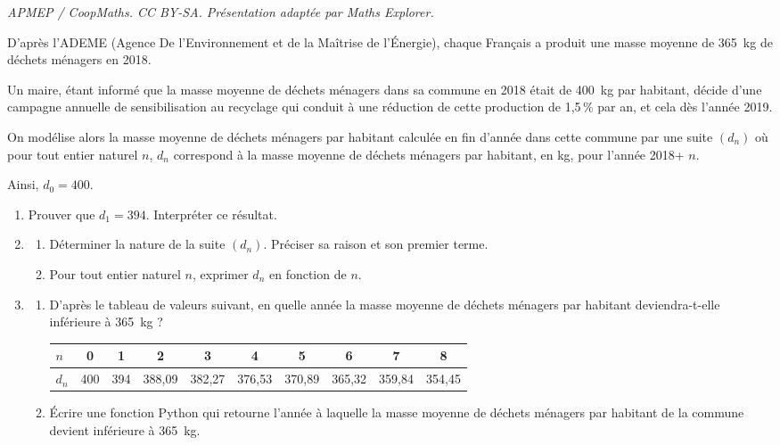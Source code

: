 \documentclass[10pt]{article}
\providecommand{\np}[2][]{{#2~#1}}
\begin{document}
\noindent\textit{APMEP / CoopMaths. CC BY-SA. Présentation adaptée par Maths Explorer.}\par\medskip
\medskip

D'après l'ADEME (Agence De l'Environnement et de la Maîtrise de l'Énergie), chaque Français
a produit une masse moyenne de \np[kg]{365}  de déchets ménagers en 2018.

Un maire, étant informé que la masse moyenne de déchets ménagers dans sa commune en
2018 était de \np[kg]{400}  par habitant, décide d'une campagne annuelle de sensibilisation au
recyclage qui conduit à une réduction de cette production de 1,5\,\% par an, et cela dès
l'année 2019.

On modélise alors la masse moyenne de déchets ménagers par habitant calculée en fin
d'année dans cette commune par une suite $(d_n)$ où pour tout entier naturel $n$, $d_n$
correspond à la masse moyenne de déchets ménagers par habitant, en kg, pour l'année
2018+ $n$.

Ainsi, $d_0 = 400$.

\medskip

\begin{enumerate}
\item Prouver que $d_1 = 394$. Interpréter ce résultat.
\item 
	\begin{enumerate}
		\item  Déterminer la nature de la suite $(d_n)$. Préciser sa raison et son premier terme.
		\item Pour tout entier naturel $n$, exprimer $d_n$ en fonction de $n$.
	\end{enumerate}
\item 
	\begin{enumerate}
		\item  D'après le tableau de valeurs suivant, en quelle année la masse moyenne de déchets
ménagers par habitant deviendra-t-elle inférieure à \np[kg]{365} ?

\smallskip

\begin{tabular}[]{|l|*{9}{c|}}
\hline
$n$& 0& 1& 2& 3& 4& 5& 6 &7& 8\\
\hline
$d_n$& 400& 394& 388,09& 382,27& 376,53& 370,89& 365,32& 359,84& 354,45\\
\hline
\end{tabular}

		\item Écrire une fonction Python qui retourne l'année à laquelle la masse moyenne de déchets
ménagers par habitant de la commune devient inférieure à \np[kg]{365}.
	\end{enumerate}
\end{enumerate}
\end{document}
